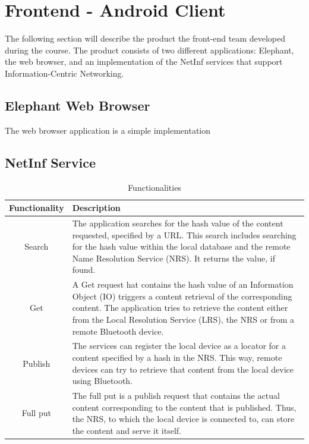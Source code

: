 \section {Frontend - Android Client}
The following section will describe the product the front-end team developed during the course.
The product consists of two different applications: Elephant, the web browser, and an implementation
of the NetInf services that support Information-Centric Networking.

\subsection{Elephant Web Browser}
The web browser application is a simple implementation

\subsection{NetInf Service}

\begin{table}
\centering
 \begin{tabular}{|c|p{10cm}|}\hline
  Functionality	& Description \\\hline
  Search	& The application searches for the hash value of the content requested, specified by a URL. This search includes
		  searching for the hash value within the local database and the remote Name Resolution Service (NRS).
		  It returns the value, if found.\\\hline
  Get		& A Get request hat contains the hash value of an Information Object (IO) triggers a content retrieval of the
		  corresponding content. The application tries to retrieve the content either from the Local Resolution Service (LRS), the NRS
		  or from a remote Bluetooth device.\\\hline
  Publish	& The services can register the local device as a locator for a content specified by a hash in the NRS. This way, remote
		  devices can try to retrieve that content from the local device using Bluetooth. \\\hline
  Full put	& The full put is a publish request that contains the actual content corresponding to the content that is published. Thus,
		  the NRS, to which the local device is connected to, can store the content and serve it itself.\\\hline
		  
 \end{tabular}
  \caption{Functionalities}\label{tab:netinffunctionalities}
\end{table}

